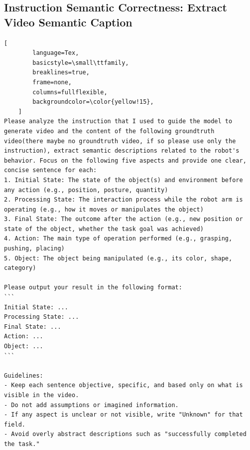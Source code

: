 \begin{tcolorbox}[
    promptstyle, 
    width=\linewidth, 
    breakable
] 
    \subsection*{Instruction Semantic Correctness: Extract Video Semantic Caption}

    \begin{lstlisting}[
        language=Tex, 
        basicstyle=\small\ttfamily,
        breaklines=true,
        frame=none, 
        columns=fullflexible,
        backgroundcolor=\color{yellow!15}, 
    ]
Please analyze the instruction that I used to guide the model to generate video and the content of the following groundtruth video(there maybe no groundtruth video, if so please use only the instruction), extract semantic descriptions related to the robot's behavior. Focus on the following five aspects and provide one clear, concise sentence for each:
1. Initial State: The state of the object(s) and environment before any action (e.g., position, posture, quantity)
2. Processing State: The interaction process while the robot arm is operating (e.g., how it moves or manipulates the object)
3. Final State: The outcome after the action (e.g., new position or state of the object, whether the task goal was achieved)
4. Action: The main type of operation performed (e.g., grasping, pushing, placing)
5. Object: The object being manipulated (e.g., its color, shape, category)

Please output your result in the following format:
```
Initial State: ...
Processing State: ...
Final State: ...
Action: ...
Object: ...
```

Guidelines:
- Keep each sentence objective, specific, and based only on what is visible in the video.
- Do not add assumptions or imagined information.
- If any aspect is unclear or not visible, write "Unknown" for that field.
- Avoid overly abstract descriptions such as "successfully completed the task."

    \end{lstlisting}
    
\end{tcolorbox}

\centering

